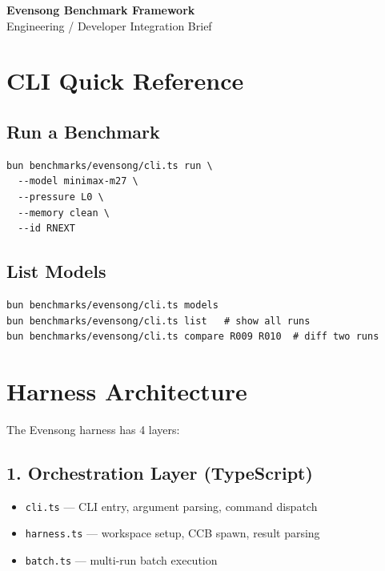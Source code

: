 \documentclass[11pt,a4paper]{article}
\begin{document}
\begin{center}
{\fontsize{22pt}{28pt}\selectfont\sffamily\bfseries\color{deep}Evensong Benchmark Framework}\\
{\fontsize{11pt}{14pt}\selectfont\sffamily\color{gray}Engineering / Developer Integration Brief}
\end{center}
\vspace{2mm}{\color{deep}\rule{\textwidth}{0.5pt}}\vspace{2mm}

\section{CLI Quick Reference}

\subsection{Run a Benchmark}
\begin{verbatim}
bun benchmarks/evensong/cli.ts run \
  --model minimax-m27 \
  --pressure L0 \
  --memory clean \
  --id RNEXT
\end{verbatim}

\subsection{List Models}
\begin{verbatim}
bun benchmarks/evensong/cli.ts models
bun benchmarks/evensong/cli.ts list   # show all runs
bun benchmarks/evensong/cli.ts compare R009 R010  # diff two runs
\end{verbatim}

\section{Harness Architecture}

The Evensong harness has 4 layers:

\subsection{1. Orchestration Layer (TypeScript)}
\begin{itemize}
  \item \texttt{cli.ts} — CLI entry, argument parsing, command dispatch
  \item \texttt{harness.ts} — workspace setup, CCB spawn, result parsing
  \item \texttt{batch.ts} — multi-run batch execution
\end{itemize}
\end{document}
